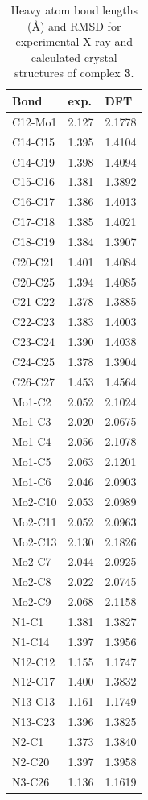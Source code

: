 \begin{longtable}{lll}
\caption{Heavy atom bond lengths (\AA) and RMSD for experimental X-ray and calculated crystal structures of complex \textbf{3}.} \label{tab:bondlengths3} \\
\textbf{Bond} & \textbf{exp.} & \textbf{DFT} \\ \hline
C12-Mo1 & 2.127 & 2.1778 \\
C14-C15 & 1.395 & 1.4104 \\
C14-C19 & 1.398 & 1.4094 \\
C15-C16 & 1.381 & 1.3892 \\
C16-C17 & 1.386 & 1.4013 \\
C17-C18 & 1.385 & 1.4021 \\
C18-C19 & 1.384 & 1.3907 \\
C20-C21 & 1.401 & 1.4084 \\
C20-C25 & 1.394 & 1.4085 \\
C21-C22 & 1.378 & 1.3885 \\
C22-C23 & 1.383 & 1.4003 \\
C23-C24 & 1.390 & 1.4038 \\
C24-C25 & 1.378 & 1.3904 \\
C26-C27 & 1.453 & 1.4564 \\
Mo1-C2 & 2.052 & 2.1024 \\
Mo1-C3 & 2.020 & 2.0675 \\
Mo1-C4 & 2.056 & 2.1078 \\
Mo1-C5 & 2.063 & 2.1201 \\
Mo1-C6 & 2.046 & 2.0903 \\
Mo2-C10 & 2.053 & 2.0989 \\
Mo2-C11 & 2.052 & 2.0963 \\
Mo2-C13 & 2.130 & 2.1826 \\
Mo2-C7 & 2.044 & 2.0925 \\
Mo2-C8 & 2.022 & 2.0745 \\
Mo2-C9 & 2.068 & 2.1158 \\
N1-C1 & 1.381 & 1.3827 \\
N1-C14 & 1.397 & 1.3956 \\
N12-C12 & 1.155 & 1.1747 \\
N12-C17 & 1.400 & 1.3832 \\
N13-C13 & 1.161 & 1.1749 \\
N13-C23 & 1.396 & 1.3825 \\
N2-C1 & 1.373 & 1.3840 \\
N2-C20 & 1.397 & 1.3958 \\
N3-C26 & 1.136 & 1.1619 \\

\end{longtable}
